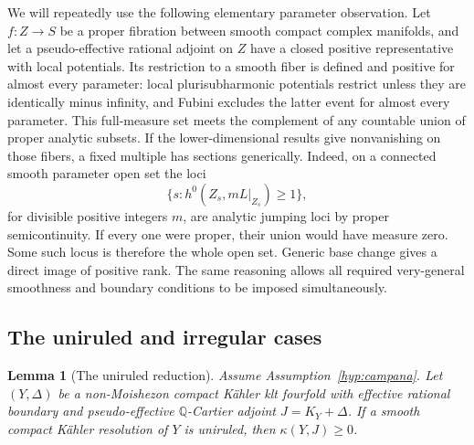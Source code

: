 \documentclass[11pt,letterpaper]{article}
\newcommand{\Q}{\mathbb{Q}}
\newtheorem{lemma}[theorem]{Lemma}
\theoremstyle{definition}
\theoremstyle{remark}
\begin{document}
We will repeatedly use the following elementary parameter observation.
Let \(f:Z\to S\) be a proper fibration between smooth compact complex
manifolds, and let a pseudo-effective rational adjoint on \(Z\) have a
closed positive representative with local potentials. Its restriction
to a smooth fiber is defined and positive for almost every parameter:
local plurisubharmonic potentials restrict unless they are identically
minus infinity, and Fubini excludes the latter event for almost every
parameter. This full-measure set meets the complement of any countable
union of proper analytic subsets. If the lower-dimensional results give
nonvanishing on those fibers, a fixed multiple has sections generically.
Indeed, on a connected smooth parameter open set the loci
\[
 \{s:h^0(Z_s,mL|_{Z_s})\geq1\},
\]
for divisible positive integers \(m\), are analytic jumping loci by
proper semicontinuity. If every one were proper, their union would have
measure zero. Some such locus is therefore the whole open set. Generic
base change gives a direct image of positive rank. The same reasoning
allows all required very-general smoothness and boundary conditions to
be imposed simultaneously.

\subsection{The uniruled and irregular cases}

\begin{lemma}[The uniruled reduction]\label{red:uniruled}
Assume Assumption~\ref{hyp:campana}.
Let \((Y,\Delta)\) be a non-Moishezon compact Kähler klt fourfold with
effective rational boundary and pseudo-effective \(\Q\)-Cartier adjoint
\(J=K_Y+\Delta\). If a smooth compact Kähler resolution of \(Y\) is
uniruled, then \(\kappa(Y,J)\geq0\).
\end{lemma}
\end{document}
